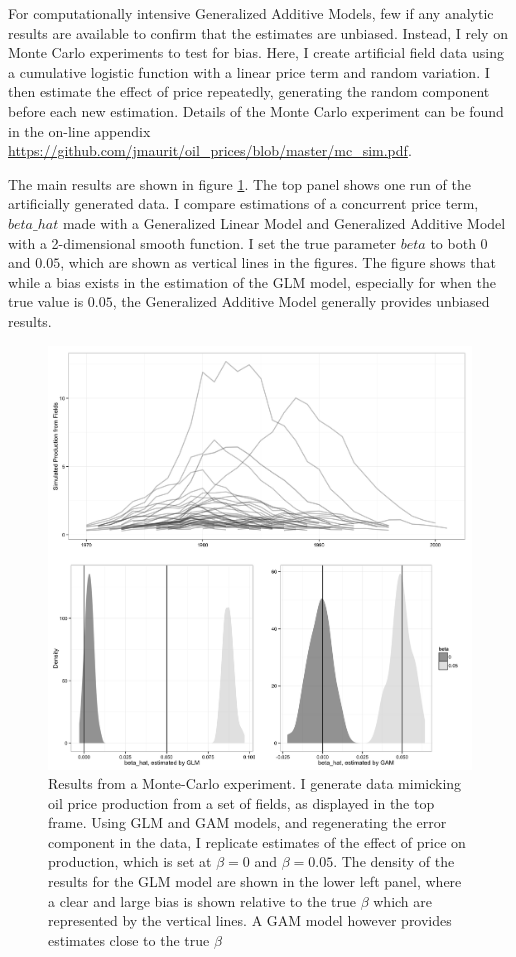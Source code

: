 \documentclass[12pt]{article}
\begin{document}
For computationally intensive Generalized Additive Models, few if any analytic results are available to confirm that the estimates are unbiased.  Instead, I rely on Monte Carlo experiments to test for bias.  Here, I create artificial field data using a cumulative logistic function with a linear price term and random variation. I then estimate the effect of price repeatedly, generating the random component before each new estimation. Details of the Monte Carlo experiment can be found in the on-line appendix \url{https://github.com/jmaurit/oil_prices/blob/master/mc_sim.pdf}.  

The main results are shown in figure \ref{mc_results}.  The top panel shows one run of the artificially generated data. I compare estimations of a concurrent price term, $beta\_hat$ made with a Generalized Linear Model and Generalized Additive Model with a 2-dimensional smooth function.  I set the true parameter $beta$ to both $0$ and $0.05$, which are shown as vertical lines in the figures.  The figure shows that while a bias exists in the estimation of the GLM model, especially for when the true value is $0.05$, the Generalized Additive Model generally provides unbiased results. 

\begin{figure}
	\includegraphics[width=1\textwidth]{figures/mc_plot.png}
	\caption{Results from a Monte-Carlo experiment. I generate data mimicking oil price production from a set of fields, as displayed in the top frame. Using GLM and GAM models, and regenerating the error component in the data, I replicate estimates of the effect of price on production, which is set at $\beta = 0$ and $\beta=0.05$. The density of the results for the GLM model are shown in the lower left panel, where a clear and large bias is shown relative to the true $\beta$ which are represented by the vertical lines.  A GAM model however provides estimates close to the true $\beta$}
	\label{mc_results}
\end{figure}
\end{document}
